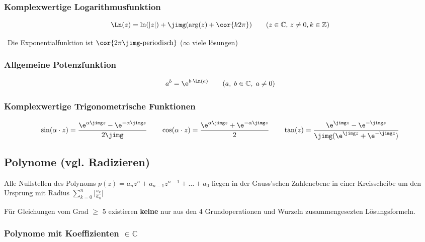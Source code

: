 \subsubsection{Komplexwertige Logarithmusfunktion}

\textbf{}

\[ \Ln(z) = \ln(\vert z \vert) + \jimg (\arg(z)+ \cor{k2\pi}) \qquad (z \in \mathbb{C}, \, z \neq 0, k \in \mathbb{Z})\]

\textrightarrow\ Die Exponentialfunktion ist $\cor{2 \pi \jimg\text{-periodisch}}$ ($\infty$ viele lösungen)

    

\subsubsection{Allgemeine Potenzfunktion}

\textbf{} 
\[a^b = \e^{b \cdot \Ln(a)} \qquad (a, \; b \in \mathbb{C}, \; a \neq 0)\]


\subsubsection{Komplexwertige Trigonometrische Funktionen}

\vspace{-0.2cm}

\[\sin(\alpha \cdot z) = \frac{\e^{\alpha \jimg z} - \e^{-\alpha \jimg z}}{2 \jimg} \qquad 
\cos(\alpha \cdot z) = \frac{\e^{\alpha \jimg z} + \e^{-\alpha \jimg z}}{2} \qquad 
\tan(z) = \frac{\e^{\jimg z} - \e^{-\jimg z}}{\jimg(\e^{\jimg z} + \e^{-\jimg z})}\]


\subsection{Polynome (vgl. Radizieren)}
Alle Nullstellen des Polynoms $p(z) = a_n z^n + a_{n-1}z^{n-1} + \ldots + a_0$ liegen in der Gauss'schen Zahlenebene in einer
Kreisscheibe um den Ursprung mit Radius $\sum\limits _{k=0}^n \bigl| \frac{a_k}{a_n} \bigl|$

\smallskip

Für Gleichungen vom Grad $\geq$ 5 existieren \textbf{keine} nur aus den 4 Grundoperationen und Wurzeln zusammengesezten Lösungsformeln.	


\subsubsection{Polynome mit Koeffizienten $\bm{\in \mathbb{C}}$}


